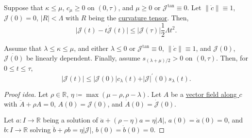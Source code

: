 \begin{corollary}
	Suppose that \(\kappa \leq \mu \), \(c_\mu \geq 0\) on \((0, \tau )\), and \(\mu \geq 0\) or \(\mathcal{J} ^{\text{tan} }\equiv 0\). Let \(\lVert \dot{c} \rVert \equiv 1\), \(\mathcal{J} (0) = 0\), \(\vert R \vert < \Lambda \) with \(R\) being the \hyperref[def:Riemannian-curvature]{curvature tensor}. Then,
	\[
		\vert \mathcal{J} (t) - t \dot{\mathcal{J} } (t) \vert \leq \vert \mathcal{J} (\tau ) \vert \frac{1}{2} \Lambda t^2.
	\]
\end{corollary}

\begin{theorem}
	Assume that \(\lambda \leq \kappa \leq \mu \), and either \(\lambda \leq 0\) or \(\mathcal{J} ^{\text{tan} } \equiv 0\), \(\lVert \dot{c} \rVert \equiv 1\), and \(\mathcal{J} (0)\), \(\dot{\mathcal{J} (0)} \) be linearly dependent. Finally, assume \(s_{(\lambda + \mu ) / 2} > 0\) on \((0, \tau )\). Then, for \(0 \leq t \leq \tau \),
	\[
		\vert \mathcal{J} (t) \vert \leq \vert \mathcal{J} (0) \vert c_\lambda (t) + \vert \mathcal{J}  \vert ^{\prime} (0) s_\lambda (t).
	\]
\end{theorem}
\begin{proof}[Proof idea]
	Let \(\rho \in \mathbb{R} \), \(\eta \coloneqq \max (\mu - \rho , \rho - \lambda )\). Let \(A\) be a \hyperref[def:vector-field-along-curve]{vector field along \(c\)} with \(\ddot{A} + \rho A = 0\), \(A(0) = \mathcal{J} (0)\), and \(\dot{A}(0) = \dot{\mathcal{J} } (0) \).

	Let \(a \colon I \to \mathbb{R} \) being a solution of \(\ddot{a} + (\rho -\eta )a = \eta \vert A \vert \), \(a(0) = \dot{a} (0) = 0\), and \(b \colon I \to \mathbb{R} \) solving \(\ddot{b} + \rho b = \eta \vert \mathcal{J}  \vert \), \(b(0) = \dot{b} (0) = 0\).
\end{proof}